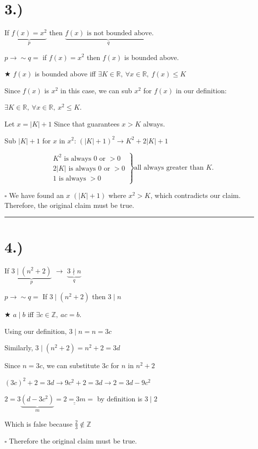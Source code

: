 \documentclass[11pt]{article}
\begin{document}
\section*{3.)}

If $\underbrace{f(x) = x^2}_{p}$ then $\underbrace{f(x) \text{ is not bounded above}}_{q}$.

$p \to {\sim}q =$ if $f(x) = x^2$ then $f(x)$ is bounded above.

$\bigstar$ $f(x)$ is bounded above iff $\exists K \in \mathbb{R},\ \forall x \in \mathbb{R},\ f(x) \leq K$


Since $f(x)$ is $x^2$ in this case, we can sub $x^2$ for $f(x)$ in our definition:

$\exists K \in \mathbb{R},\ \forall x \in \mathbb{R},\ x^2 \leq K$.

Let $x = |K| + 1$ Since that guarantees $x > K$ always.

Sub $|K| + 1$ for $x$ in $x^2$: $(|K| + 1)^2 \to K^2 + 2|K| + 1$

  \[
  \left.
  \begin{aligned}
  &K^2 \text{ is always } 0 \text{ or } > 0\\
  &2|K| \text{ is always } 0 \text{ or } > 0\\
  &1 \text{ is always } > 0
  \end{aligned}
  \right\} \text{all always greater than } K.
  \]


\hfill $\square$ \quad We have found an $x$ $(|K| + 1)$ where $x^2 > K$, which contradicts our claim. Therefore, the original claim must be true.

\bigskip\hrule\bigskip

\section*{4.)}

If $\underbrace{3 \mid (n^2 + 2)}_{p}$ $\to$ $\underbrace{3 \nmid n}_{q}$

$p \to {\sim}q =$ If $3 \mid (n^2 + 2)$ then $3 \mid n$

$\bigstar$ $a \mid b$ iff $\exists c \in \mathbb{Z},\ ac = b$.

Using our definition, $3 \mid n = n = 3c$

Similarly, $3 \mid (n^2 + 2) = n^2 + 2 = 3d$

Since $n = 3c$, we can substitute $3c$ for $n$ in $n^2 + 2$

$(3c)^2 + 2 = 3d \to 9c^2 + 2 = 3d \to 2 = 3d - 9c^2$

$2 = 3\underbrace{(d - 3c^2)}_{m} = \underline{\underline{2 = 3m}} =$ by definition is $3 \mid 2$

Which is false because $\frac{2}{3} \notin \mathbb{Z}$

\hfill $\square$ \quad Therefore the original claim must be true.
\end{document}
